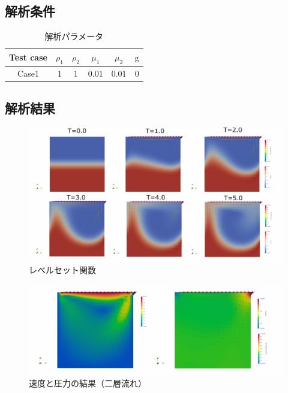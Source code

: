 \documentclass[8pt,a4paper]{article}
\begin{document}
\subsection{解析条件}
\renewcommand{\arraystretch}{1}
\begin{table}[H]
	\centering
	\caption{解析パラメータ}
	\begin{tabular}{cccccc}
		\hline
		Test case & $\rho_1$ & $\rho_2$ & $\mu_1$ & $\mu_2$ & $\mathrm{g}$\\
		\hline 
		Case$1$ & $1$ & $1$ & $0.01$ & $0.01$   & $0$ \\
		\hline         
	\end{tabular}
	\label{table:mars-env}
\end{table}
\renewcommand{\arraystretch}{1.0}

\subsection{解析結果}
\begin{figure}[htbp]
	\centering
	\includegraphics[width=18truecm]{pics/3d-cavity/levelset_velocity.pdf}
	\caption{レベルセット関数}
	\label{fig:3d-bubble-levelset_t0-3}
\end{figure}

\begin{figure}[htbp]
	\centering
	\includegraphics[width=18truecm]{pics/3d-cavity/velocity_pressure.pdf}
	\caption{速度と圧力の結果（二層流れ）}
	\label{fig:3d-bubble-levelset_t0-3}
\end{figure}
\end{document}
